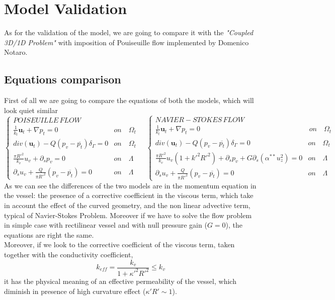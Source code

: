 \documentclass[a4paper]{report}
\begin{document}
\newpage
\chapter{Model Validation}
As for the validation of the model, we are going to compare it with the \textit{"Coupled 3D/1D Problem"} with imposition of Pouiseuille flow implemented by Domenico Notaro.
\section{Equations comparison}
First of all we are going to compare the equations of both the models, which will look quiet similar
\begin{equation*}
\begin{cases}
POISEUILLE \, FLOW \quad \quad &\\
\frac{1}{k_t} \mathbf{u}_t + \nabla p_t =0 &  on \quad \Omega_t\\
div(\mathbf{u}_t)-Q(p_v-\overline{p_t})\delta_{\Gamma}=0 &  on \quad \Omega_t\\
\frac{\pi R'^2}{k_v}u_v + \partial_{s}p_v = 0 &  on \quad \Lambda\\
\partial_s u_v + \frac{Q}{\pi R'^2}(p_v-\overline{p_t})=0 &  on \quad \Lambda
\end{cases}\quad
\begin{cases}
NAVIER-STOKES \, FLOW \quad \quad &\\
\frac{1}{k_t} \mathbf{u}_t + \nabla p_t =0 & \, on \quad \Omega_t\\
div(\mathbf{u}_t)-Q(p_v-\overline{p_t})\delta_{\Gamma}=0 &  on \quad \Omega_t\\
\frac{\pi R'^2}{k_v}u_v(1+k'^2 R'^2) + \partial_{s}p_v + G\partial_s (\alpha^{**}u_z^2) = 0 &  on \quad \Lambda\\
\partial_s u_v + \frac{Q}{\pi R'^2}(p_v-\overline{p_t})=0 &  on \quad \Lambda
\end{cases}
\end{equation*}
As we can see the differences of the two models are in the momentum equation in the vessel: the presence of a corrective coefficient in the viscous term, which take in account the effect of the curved geometry, and the non linear advective term, typical of Navier-Stokes Problem. Moreover if we have to solve the flow problem in simple case with rectilinear vessel and with null pressure gain ($G=0$), the equations are right the same.\\
Moreover, if we look to the corrective coefficient of the viscous term, taken together with the conductivity coefficient,
\begin{equation}
k_{eff}=\frac{k_v}{1+\kappa'^2 R'^2} \leq k_v
\end{equation}
it has the physical meaning of an effective permeability of the vessel, which diminish in presence of high curvature effect ($\kappa' R' \sim 1$).
\end{document}
